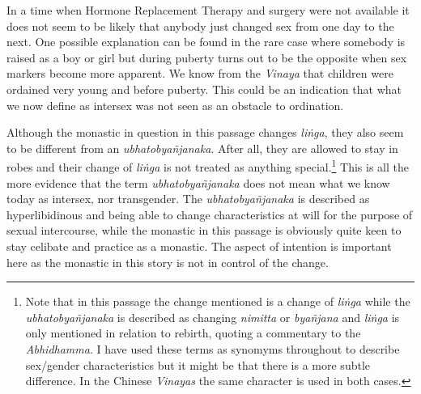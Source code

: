 In a time when Hormone Replacement Therapy and surgery were not available it does not seem to be likely that anybody just changed sex from one day to the next. One possible explanation can be found in the rare case where somebody is raised as a boy or girl but during puberty turns out to be the opposite when sex markers become more apparent. We know from the \textit{Vinaya} that children were ordained very young and before puberty. This could be an indication that what we now define as intersex was not seen as an obstacle to ordination. 

Although the monastic in question in this passage changes \textit{liṅga}, they also seem to be different from an \textit{ubhatob­yañ­janaka}. After all, they are allowed to stay in robes and their change of \textit{liṅga} is not treated as anything special.\footnote{Note that in this passage the change mentioned is a change of \textit{liṅga} while the \textit{ubhatob­yañ­janaka} is described as changing \textit{nimitta} or \textit{byañjana} and \textit{liṅga} is only mentioned in relation to rebirth, quoting a commentary to the \textit{Abhidhamma}. I have used these terms as synomyms throughout to describe sex/gender characteristics but it might be that there is a more subtle difference. In the Chinese \textit{Vinayas} the same character is used in both cases.} This is all the more evidence that the term \textit{ubhatob­yañ­janaka} does not mean what we know today as intersex, nor transgender. The \textit{ubhatob­yañ­janaka} is described as hyperlibidinous and being able to change characteristics at will for the purpose of sexual intercourse, while the monastic in this passage is obviously quite keen to stay celibate and practice as a monastic. The aspect of intention is important here as the monastic in this story is not in control of the change.